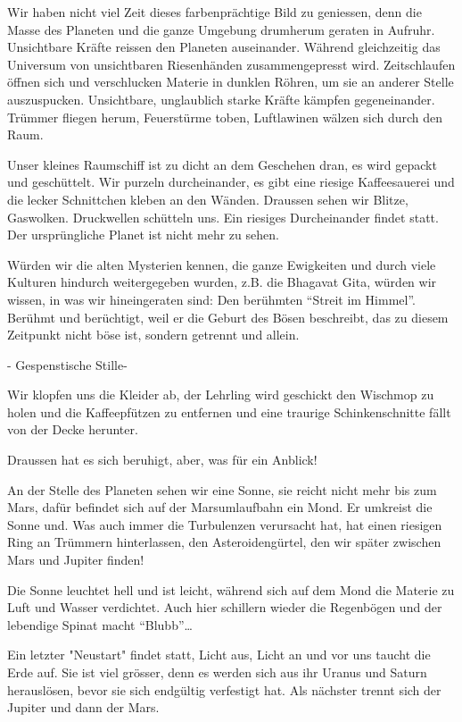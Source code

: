 \documentclass[11pt,titlepage,a5paper]{book}
\begin{document}
Wir haben nicht viel Zeit dieses farbenprächtige Bild zu geniessen, denn die Masse des Planeten und die ganze Umgebung drumherum geraten in Aufruhr. Unsichtbare Kräfte reissen den Planeten auseinander. Während gleichzeitig das Universum von unsichtbaren Riesenhänden zusammengepresst wird. Zeitschlaufen öffnen sich und verschlucken Materie in dunklen Röhren, um sie an anderer Stelle auszuspucken. Unsichtbare, unglaublich starke Kräfte kämpfen gegeneinander. Trümmer fliegen herum, Feuerstürme toben, Luftlawinen wälzen sich durch den Raum.

Unser kleines Raumschiff ist zu dicht an dem Geschehen dran, es wird gepackt und geschüttelt. Wir purzeln durcheinander, es gibt eine riesige Kaffeesauerei und die lecker Schnittchen kleben an den Wänden. Draussen sehen wir Blitze, Gaswolken. Druckwellen schütteln uns. Ein riesiges Durcheinander findet statt. Der ursprüngliche Planet ist nicht mehr zu sehen.

Würden wir die alten Mysterien kennen, die ganze Ewigkeiten und durch viele Kulturen hindurch weitergegeben wurden, z.B. die Bhagavat Gita, würden wir wissen, in was wir hineingeraten sind: Den berühmten "`Streit im Himmel"'. Berühmt und berüchtigt, weil er die Geburt des Bösen beschreibt, das zu diesem Zeitpunkt nicht böse ist, sondern getrennt und allein.

- Gespenstische Stille-

Wir klopfen uns die Kleider ab, der Lehrling wird geschickt den Wischmop zu holen und die Kaffeepfützen zu entfernen und eine traurige Schinkenschnitte fällt von der Decke herunter.

Draussen hat es sich beruhigt, aber, was für ein Anblick!

An der Stelle des Planeten sehen wir eine Sonne, sie reicht nicht mehr bis zum Mars, dafür befindet sich auf der Marsumlaufbahn ein Mond. Er umkreist die Sonne und. Was auch immer die Turbulenzen verursacht hat, hat einen riesigen Ring an Trümmern hinterlassen, den Asteroidengürtel, den wir später zwischen Mars und Jupiter finden!

Die Sonne leuchtet hell und ist leicht, während sich auf dem Mond die Materie zu Luft und Wasser verdichtet. Auch hier schillern wieder die Regenbögen und der lebendige Spinat macht "`Blubb"'\dots

Ein letzter "Neustart" findet statt, Licht aus, Licht an und vor uns taucht die Erde auf. Sie ist viel grösser, denn es werden sich aus ihr Uranus und Saturn herauslösen, bevor sie sich endgültig verfestigt hat. Als nächster trennt sich der Jupiter und dann der Mars.
\end{document}
